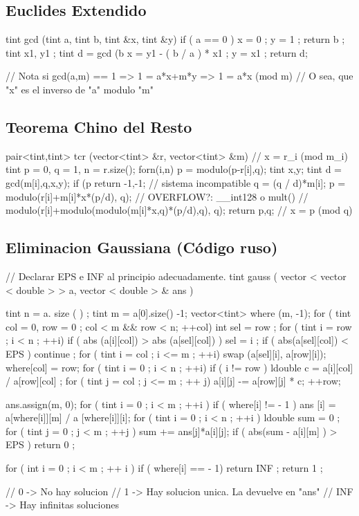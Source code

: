 \subsection{Euclides Extendido}
\begin{code}
tint gcd (tint a, tint b, tint &x, tint &y)
{
	if ( a == 0 ) 
	{
		x = 0 ; y = 1 ;
		return b ;
	}
	tint x1, y1 ;
	tint d = gcd (b %
	x = y1 - ( b / a ) * x1 ;
	y = x1 ;
	return d;
} 

// Nota si gcd(a,m) == 1 => 1 = a*x+m*y => 1 = a*x (mod m)
// O sea, que "x" es el inverso de "a" modulo "m"

\end{code}

\subsection{Teorema Chino del Resto}

\begin{code}

pair<tint,tint> tcr (vector<tint> &r, vector<tint> &m) // x = r_i (mod m_i)
{
	tint p = 0, q = 1, n = r.size();
	forn(i,n)
	{
		p = modulo(p-r[i],q);
		tint x,y;
		tint d = gcd(m[i],q,x,y);
		if (p %
		return {-1,-1}; // sistema incompatible
		q = (q / d)*m[i];
		p = modulo(r[i]+m[i]*x*(p/d), q); //  OVERFLOW?: __int128 o mult()
		// modulo(r[i]+modulo(modulo(m[i]*x,q)*(p/d),q), q); 
	}
	return {p,q}; // x = p (mod q)
}


\end{code}


\subsection{Eliminacion Gaussiana (Código ruso)}
\begin{code}
// Declarar EPS e INF al principio adecuadamente.
tint gauss ( vector < vector < double > > a, vector < double > & ans ) {
	tint n = a. size ( ) ;
	tint m = a[0].size() -1;
	vector<tint> where (m, -1);
	for ( tint col = 0, row = 0 ; col < m && row < n; ++col)
	{
		int sel = row ;
		for ( tint i = row ; i < n ; ++i)
			if ( abs (a[i][col]) > abs (a[sel][col]) )
				sel = i ;
		if ( abs(a[sel][col]) < EPS )
			continue ;
		for ( tint i = col ; i <= m ; ++i)
			swap (a[sel][i], a[row][i]);
		where[col] = row;
		for ( tint i = 0 ; i < n ; ++i)
			if ( i != row ) 
			{
				ldouble c = a[i][col] / a[row][col] ;
				for ( tint j = col ; j <= m ; ++ j)
					a[i][j] -= a[row][j] * c;
			}
		++row;
	}
 
	ans.assign(m, 0);
	for ( tint i = 0 ; i < m ; ++i )
		if ( where[i] != - 1 )
			ans [i] = a[where[i]][m] / a [where[i]][i];
	for ( tint i = 0 ; i < n ; ++i ) 
	{
		ldouble sum = 0 ;
		for ( tint j = 0 ; j < m ; ++j )
			sum += ans[j]*a[i][j];
		if ( abs(sum - a[i][m] ) > EPS )
			return 0 ;
	}
 
	for ( int i = 0 ; i < m ; ++ i )
		if ( where[i] == - 1)
			return INF ;
	return 1 ;
}

// 0 -> No hay solucion
// 1 -> Hay solucion unica. La devuelve en "ans"
// INF -> Hay infinitas soluciones

\end{code}

